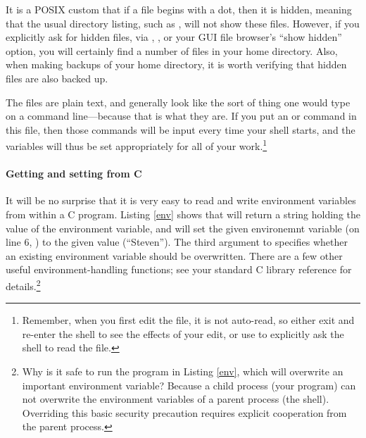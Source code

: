   
It is a POSIX
custom that if a file begins with a dot, then it is hidden, meaning that the usual
directory listing, such as , will not show these files. However,
if you explicitly ask for hidden files, via , , or your GUI
file browser's ``show hidden'' option, you will certainly find a number
of  files in your home directory. Also, when making backups of
your home directory, it is worth verifying that hidden files are also
backed up.

The  files are plain text, and generally look like the sort of
thing one would type on a command line---because that is what they are.
If you put an  or  command in this file, then 
those commands will be input every time your shell starts, and the
variables will thus be set appropriately for all of your
work.\footnote{Remember, when you first edit the file, it is not auto-read, so either exit and
re-enter the shell to see the effects of your edit, or use  to explicitly ask the shell to read the file.}

\paragraph{\treesymbol Getting and setting from C}
It will be no surprise that it is very easy to read and write 
environment variables from within a C program. Listing \ref{env}
shows that  will return a string holding the value of the
environment variable, and  will set the given environemnt
variable (on line 6, ) to the given value (``Steven''). The third
argument to  specifies whether an existing environment variable
should be overwritten. There are a few other useful environment-handling
functions; see your standard C library reference for details.\footnote{Why
is it safe to run the program in Listing \ref{env}, which will overwrite
an important environment variable? Because a child process (your program)
can not overwrite the  environment variables of a parent process (the
shell). Overriding this basic security precaution requires explicit
cooperation from the parent process.}

\lstset{numbers=left, numberstyle=\scshape}
\lstset{numbers=none}


